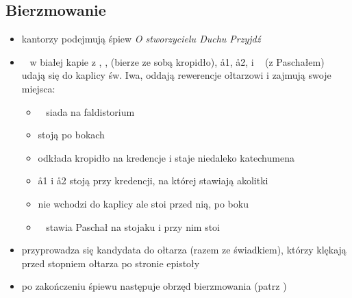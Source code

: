 \subsection{Bierzmowanie}
\begin{itemize}
	\item kantorzy podejmują śpiew \textit{O stworzycielu Duchu Przyjdź}
	\item \ii~ w białej kapie z , ,  (bierze ze sobą kropidło),
	      \aa1, \aa2,  i \paschal~ (z Paschałem) udają się do kaplicy
	      św. Iwa, oddają rewerencje ołtarzowi i zajmują swoje miejsca:
	      \begin{itemize}
		      \item \ii~ siada na faldistorium
		      \item {} stoją po bokach \ii~
		      \item {} odkłada kropidło na kredencje i staje niedaleko
		            katechumena
		      \item \aa1 i \aa2 stoją przy kredencji, na której stawiają
		            akolitki
		      \item {} nie wchodzi do kaplicy ale stoi przed nią, po boku
		      \item \paschal~ stawia Paschał na stojaku i przy nim stoi
	      \end{itemize}
	\item przyprowadza się kandydata do ołtarza (razem ze świadkiem), którzy
	      klękają przed stopniem ołtarza po stronie epistoły
	\item po zakończeniu śpiewu następuje obrzęd bierzmowania (patrz
	      \textit{})
\end{itemize}
